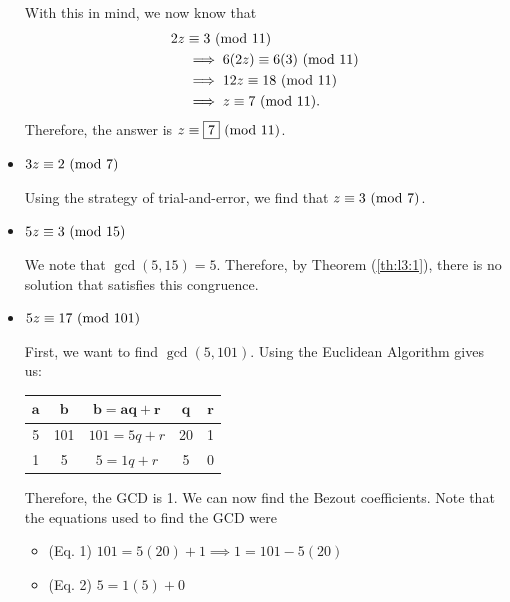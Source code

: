 \documentclass[letterpaper]{article}
\newcommand{\0}{\mathbf{0}}
\begin{document}
\begin{mdframed}
\begin{itemize}
\begin{mdframed}
            \bigskip 

            With this in mind, we now know that 
            \begin{equation*}
                \begin{aligned}
                    2z &\equiv 3 \ (\mathrm{mod}\ 11) \\ 
                        &\implies 6(2z) \equiv 6(3) \ (\mathrm{mod}\ 11) \\ 
                        &\implies 12z \equiv 18 \ (\mathrm{mod}\ 11) \\ 
                        &\implies z \equiv 7 \ (\mathrm{mod}\ 11).
                \end{aligned}
            \end{equation*}
            Therefore, the answer is $z \equiv \boxed{7} \ (\mathrm{mod}\ 11)$.
        \end{mdframed}
        
        \item $3z \equiv 2 \ (\mathrm{mod}\ 7)$
        \begin{mdframed}
            Using the strategy of trial-and-error, we find that $z \equiv 3 \ (\mathrm{mod}\ 7)$. 
        \end{mdframed}
        
        \item $5z \equiv 3 \ (\mathrm{mod}\ 15)$
        \begin{mdframed}
            We note that $\gcd(5, 15) = 5$. Therefore, by Theorem (\ref{th:l3:1}), there is no solution that satisfies this congruence.
        \end{mdframed}

        \item $5z \equiv 17 \ (\mathrm{mod}\ 101)$
        \begin{mdframed}
            First, we want to find $\gcd(5, 101)$. Using the Euclidean Algorithm gives us:
            \begin{center}
                \begin{tabular}{|c|c|c|c|c|}
                    \hline 
                    $\mathbf{a}$ & $\mathbf{b}$ & $\mathbf{b = aq + r}$ & $\mathbf{q}$ & $\mathbf{r}$ \\ 
                    \hline 
                    5 & 101 & $101 = 5q + r$ & 20 & 1 \\ 
                    1 & 5 & $5 = 1q + r$ & 5 & 0 \\ 
                    \hline 
                \end{tabular}
            \end{center}
            Therefore, the GCD is 1. We can now find the Bezout coefficients. Note that the equations used to find the GCD were 
            \begin{itemize}
                \item (Eq. 1) $101 = 5(20) + 1 \implies 1 = 101 - 5(20)$
                \item (Eq. 2) $5 = 1(5) + 0$
            \end{itemize}
            

\end{mdframed}
\end{itemize}
\end{mdframed}
\end{document}
